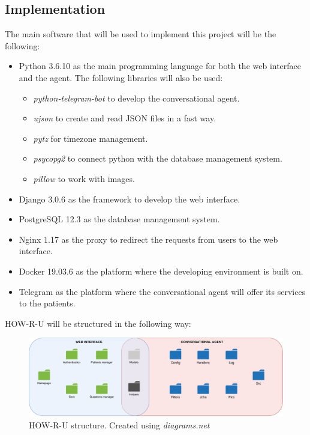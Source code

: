 \documentclass[12pt,english]{article}
\begin{document}
\subsection{Implementation}

The main software that will be used to implement this project will be the following:
\begin{itemize}
  \item Python 3.6.10 \cite{python} as the main programming language for both the web interface and the agent. The following libraries will also be used:
  \begin{itemize}
    \item \emph{python-telegram-bot} to develop the conversational agent.
    \item \emph{ujson} to create and read JSON files in a fast way.
    \item \emph{pytz} for timezone management.
    \item \emph{psycopg2} to connect python with the database management system.
    \item \emph{pillow} to work with images.
  \end{itemize}
  \item Django 3.0.6 \cite{django} as the framework to develop the web interface.
  \item PostgreSQL 12.3 \cite{postgres} as the database management system.
  \item Nginx 1.17 \cite{nginx} as the proxy to redirect the requests from users to the web interface.
  \item Docker 19.03.6 \cite{docker} as the platform where the developing environment is built on.
  \item Telegram \cite{Telegram} as the platform where the conversational agent will offer its services to the patients.
\end{itemize}

HOW-R-U will be structured in the following way:

\begin{figure}[H]
  \centering
    \includegraphics[width=\textwidth]{repo_structure.pdf}
    \caption{HOW-R-U structure. Created using \emph{diagrams.net} \protect\cite{drawio}}
\end{figure}
\newpage
\end{document}
